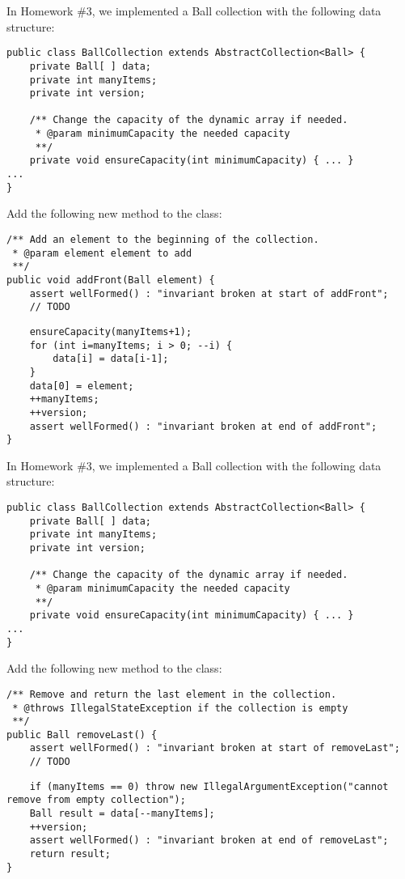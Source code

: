 \documentclass[12pt]{article}
\begin{document}
In Homework \#3, we implemented a Ball collection with the following data structure:
\begin{verbatim}
public class BallCollection extends AbstractCollection<Ball> {
    private Ball[ ] data;
    private int manyItems;
    private int version;
    
    /** Change the capacity of the dynamic array if needed.
     * @param minimumCapacity the needed capacity
     **/
    private void ensureCapacity(int minimumCapacity) { ... }
...
}
\end{verbatim}
Add the following new method to the class:
\begin{verbatim}
/** Add an element to the beginning of the collection.
 * @param element element to add
 **/
public void addFront(Ball element) {
    assert wellFormed() : "invariant broken at start of addFront";
    // TODO
\end{verbatim}
\begin{solution}
\begin{verbatim}
    ensureCapacity(manyItems+1);
    for (int i=manyItems; i > 0; --i) {
        data[i] = data[i-1];
    }
    data[0] = element;
    ++manyItems;
    ++version;
    assert wellFormed() : "invariant broken at end of addFront";
}
\end{verbatim}
\end{solution}

\newpage
\maketitle


In Homework \#3, we implemented a Ball collection with the following data structure:
\begin{verbatim}
public class BallCollection extends AbstractCollection<Ball> {
    private Ball[ ] data;
    private int manyItems;
    private int version;
    
    /** Change the capacity of the dynamic array if needed.
     * @param minimumCapacity the needed capacity
     **/
    private void ensureCapacity(int minimumCapacity) { ... }
...
}
\end{verbatim}
Add the following new method to the class:
\begin{verbatim}
/** Remove and return the last element in the collection.
 * @throws IllegalStateException if the collection is empty
 **/
public Ball removeLast() {
    assert wellFormed() : "invariant broken at start of removeLast";
    // TODO
\end{verbatim}
\begin{solution}
\begin{verbatim}
    if (manyItems == 0) throw new IllegalArgumentException("cannot remove from empty collection");
    Ball result = data[--manyItems];
    ++version;
    assert wellFormed() : "invariant broken at end of removeLast";
    return result;
}
\end{verbatim}
\end{solution}
\end{document}

